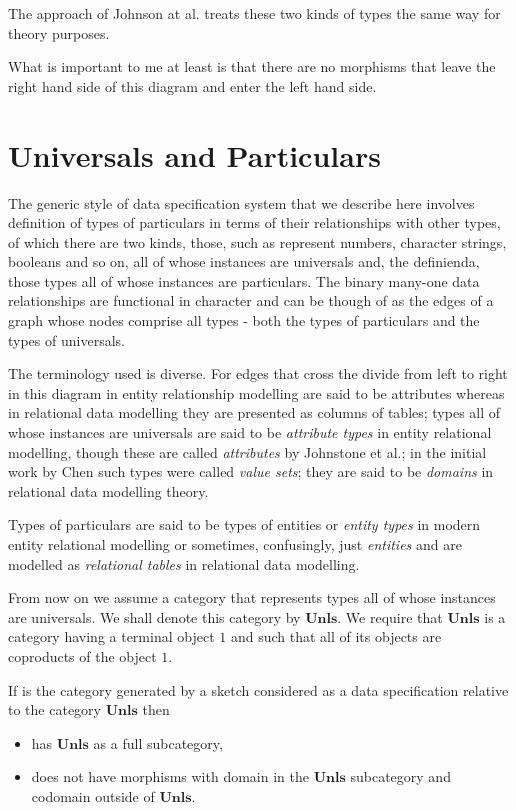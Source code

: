 \documentclass[10pt,a4paper]{article}
\theoremstyle{remark}
\begin{document}
The approach of Johnson at al. treats these two kinds of types the same way for theory purposes. 

What is important to me at least is that there are no morphisms that leave the right hand side of this diagram and enter the left hand side.


\section{Universals and Particulars}
The generic style of data specification system
that we describe here involves definition of types of particulars in terms of their relationships with other types,
of which there are two kinds, those, such as represent numbers, character strings, booleans and so on, all of
whose instances are universals and, the definienda, those types all of whose instances are particulars. The binary many-one data relationships  are functional in character and can be though of as the edges of a graph whose nodes comprise all types - both the types of particulars and the types of universals. 


The terminology used is diverse. For edges that cross the divide from left to right in this diagram 
in entity relationship modelling 
are said to be attributes whereas in relational data modelling they are presented as columns of tables; types all of whose instances are universals  are said to be \textit{attribute types} in entity relational 
modelling, though  these are called \textit{attributes} by Johnstone et al.; in the initial work by  Chen such types were called \textit{value sets}; they are said to be \textit{domains} in relational data modelling theory. 

\newcommand{\Veee}{V}
\newcommand{\veee}{v}
Types of particulars are said to be 
types of entities or \textit{entity types} in modern entity relational modelling
or sometimes, confusingly, just \textit{entities}  and 
are modelled as \textit{relational tables} in relational data modelling. 

\newcommand{\universals}{\textbf{Unls}}


From now on we  assume a category that represents types all of whose instances are universals. 
We shall denote this category by $\universals$. 
We require that $\universals$ is a category having a terminal object $1$ and such that all of its objects 
are coproducts of the object $1$. 

If \catcw is the category generated by a sketch considered as a data specification relative to 
the category $\universals$  then 
\begin{itemize}
\item \catcw has $\universals$ as a full subcategory,
\item \catcw does not have morphisms with domain in the $\universals$ subcategory 
and codomain outside of $\universals$.
\end{itemize}
\end{document}
